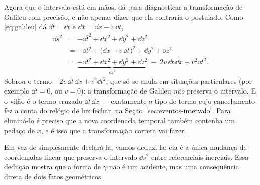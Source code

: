 \documentclass[12pt,a4paper,oneside]{book}
\theoremstyle{rgplain}
\theoremstyle{rgremark}
\begin{document}
Agora que o intervalo está em mãos, dá para diagnosticar a transformação de
Galileu com precisão, e não apenas dizer que ela contraria o postulado. Como
\eqref{eq:galileu} dá $\dd \bar t=\dd t$ e $\dd \bar x=\dd x-v\,\dd t$,
\[
\begin{aligned}
  \dd \bar s^2&=-\dd \bar t^2+\dd \bar x^2+\dd \bar y^2+\dd \bar z^2\\
          &=-\dd t^2+\big(\dd x-v\,\dd t\big)^2+\dd y^2+\dd z^2\\
          &=\underbrace{-\dd t^2+\dd x^2+\dd y^2+\dd z^2}_{\dd s^2}
            \;-\;2v\,\dd t\,\dd x+v^2\dd t^2 .
\end{aligned}
\]
Sobrou o termo $-2v\,\dd t\,\dd x+v^2\dd t^2$, que só se anula em situações
particulares (por exemplo $\dd t=0$, ou $v=0$): a transformação de Galileu
\emph{não} preserva o intervalo. E o vilão é o termo cruzado $\dd t\,\dd x$
--- exatamente o tipo de termo cujo cancelamento fez a conta do relógio de luz
fechar, na Seção~\ref{sec:eventos-intervalo}. Para eliminá-lo é preciso que a
nova coordenada temporal também contenha um pedaço de $x$, e é isso que a
transformação correta vai fazer.

Em vez de simplesmente declará-la, vamos deduzi-la: ela é a única
mudança de coordenadas linear que preserva o intervalo $\dd s^2$ entre
referenciais inerciais. Essa dedução mostra que a forma de $\gamma$ não é um
acidente, mas uma consequência direta de dois fatos geométricos.
\end{document}
